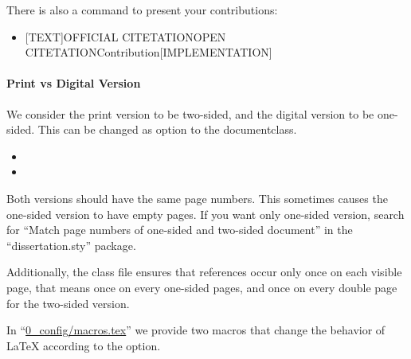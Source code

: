
There is also a command to present your contributions:

\begin{itemize}
	\item \detokenize{\contentsource}[TEXT]{OFFICIAL CITETATION}{OPEN CITETATION}{Contribution}[IMPLEMENTATION]
\end{itemize}




\paragraph{Print vs Digital Version}

We consider the print version to be two-sided, and the digital version to be one-sided. This can be changed as option to the documentclass.

\begin{itemize}
	\item {}
	\item {}
\end{itemize}

Both versions should have the same page numbers. This sometimes causes the one-sided version to have empty pages. If you want only one-sided version, search for ``Match page numbers of one-sided and two-sided document'' in the ``dissertation.sty'' package.

Additionally, the class file ensures that references occur only once on each visible page, that means once on every one-sided pages, and once on every double page for the two-sided version.

In ``\url{0_config/macros.tex}'' we provide two macros that change the behavior of LaTeX according to the option.

